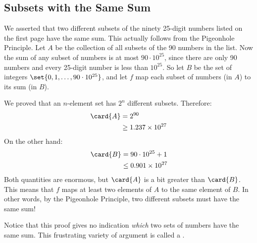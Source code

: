 \subsection{Subsets with the Same Sum}

We asserted that two different subsets of the ninety 25-digit numbers
listed on the first page have the same sum.  This actually follows
from the Pigeonhole Principle.  Let $A$ be the collection of all
subsets of the 90 numbers in the list.  Now the sum of any subset of
numbers is at most $90 \cdot 10^{25}$, since there are only 90 numbers
and every 25-digit number is less than $10^{25}$.  So let $B$ be the
set of integers $\set{0, 1, \ldots, 90 \cdot 10^{25}}$, and let $f$
map each subset of numbers (in $A$) to its sum (in $B$).

We proved that an $n$-element set has $2^n$ different subsets.
Therefore:
%
\begin{align*}
\card{A}
    & = 2^{90} \\
    & \geq 1.237 \times 10^{27}
\end{align*}
%
On the other hand:
%
\begin{align*}
\card{B}
    & = 90 \cdot 10^{25} + 1 \\
    & \leq 0.901 \times 10^{27}
\end{align*}
%
Both quantities are enormous, but $\card{A}$ is a bit greater than
$\card{B}$.  This means that $f$ maps at least two elements of $A$ to
the same element of $B$.  In other words, by the Pigeonhole Principle,
two different subsets must have the same sum!

Notice that this proof gives no indication \emph{which} two sets of
numbers have the same sum.  This frustrating variety of argument is
called a .


